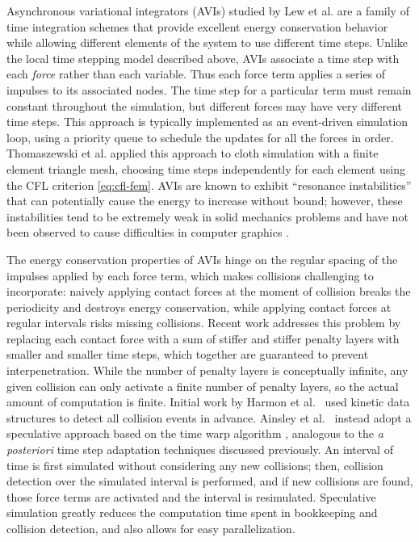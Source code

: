 Asynchronous variational integrators (AVIs) studied by Lew et al. \cite{Lew2004} are a family of time integration schemes that provide excellent energy conservation behavior while allowing different elements of the system to use different time steps.
Unlike the local time stepping model described above, AVIs associate a time step with each \emph{force} rather than each variable.
Thus each force term applies a series of impulses to its associated nodes.
The time step for a particular term must remain constant throughout the simulation, but different forces may have very different time steps.
This approach is typically implemented as an event-driven simulation loop, using a priority queue to schedule the updates for all the forces in order.
Thomaszewski et al. \cite{Thomaszewski2008} applied this approach to cloth simulation with a finite element triangle mesh, choosing time steps independently for each element using the CFL criterion \eqref{eq:cfl-fem}.
AVIs are known to exhibit ``resonance instabilities'' that can potentially cause the energy to increase without bound; however, these instabilities tend to be extremely weak in solid mechanics problems \cite{Fong2007} and have not been observed to cause difficulties in computer graphics \cite{Harmon2009}.

The energy conservation properties of AVIs hinge on the regular spacing of the impulses applied by each force term, which makes collisions challenging to incorporate: naively applying contact forces at the moment of collision breaks the periodicity and destroys energy conservation, while applying contact forces at regular intervals risks missing collisions.
Recent work \cite{Harmon2009,Ainsley2012} addresses this problem by replacing each contact force with a sum of stiffer and stiffer penalty layers with smaller and smaller time steps, which together are guaranteed to prevent interpenetration.
While the number of penalty layers is conceptually infinite, any given collision can only activate a finite number of penalty layers, so the actual amount of computation is finite.
Initial work by Harmon et al.~\cite{Harmon2009} used kinetic data structures to detect all collision events in advance.
Ainsley et al.~\cite{Ainsley2012} instead adopt a speculative approach based on the time warp algorithm \cite{Jefferson1985, Mirtich2000}, analogous to the \textit{a posteriori} time step adaptation techniques discussed previously.
An interval of time is first simulated without considering any new collisions; then, collision detection over the simulated interval is performed, and if new collisions are found, those force terms are activated and the interval is resimulated.
Speculative simulation greatly reduces the computation time spent in bookkeeping and collision detection, and also allows for easy parallelization.

